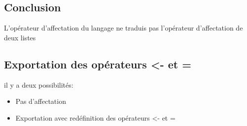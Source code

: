 \documentclass{article}
\begin{document}
	\subsection{Conclusion}
	L'opérateur d'affectation du langage ne traduis pas l'opérateur d'affectation de deux listes
	\subsection{Exportation des opérateurs <- et =}
			il y a deux possibilités:
			\begin{itemize}
				\item Pas d'affectation
				\item Exportation avec redéfinition des opérateurs <- et =
			\end{itemize}
\end{document}
